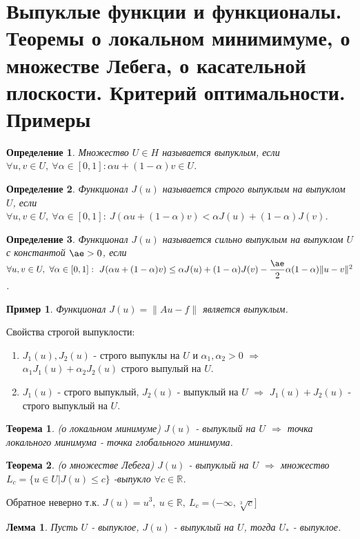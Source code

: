 \documentclass[9pt, a4paper]{extarticle}
\newtheorem*{theorem}{Теорема}
\newtheorem*{lemma}{Лемма}
\newtheorem*{definition}{Определение}
\newtheorem*{sample}{Пример}
\begin{document}
\section{Выпуклые функции и функционалы. Теоремы о локальном минимимуме, о множестве Лебега, о касательной плоскости. Критерий оптимальности. Примеры}
	\begin{definition}
		Множество $U \in H$ называется выпуклым, если $\forall u, v \in U, \ \forall \alpha \in [0,1]: \alpha u + (1-\alpha) v \in U$. 
	\end{definition}
	\begin{definition}
		Функционал $J(u)$ называется строго выпуклым на выпуклом $U$, если $\forall u, v \in U, \ \forall \alpha \in [0,1]: \ J(\alpha u + (1-\alpha)v) <  \alpha J(u) + (1-\alpha) J(v)$.
	\end{definition}
	\begin{definition}
		Функционал $J(u)$ называется сильно выпуклым на выпуклом $U$ с константой $\ae > 0$, если $\forall u, v \in U, \ \forall \alpha \in [0,1]: \ J(\alpha u + (1-\alpha)v) \leq  \alpha J(u) + (1-\alpha) J(v) - \dfrac\ae2 \alpha(1-\alpha) \|u-v\|^2$.
	\end{definition}
	\begin{sample}
		Функционал $J(u) = \|Au - f\|$ является выпуклым.
	\end{sample}
	Свойства строгой выпуклости:
	\begin{enumerate}
		\item $J_1(u), J_2(u)$ - строго выпуклы на $U$ и $\alpha_1, \alpha_2 >0$ $\Rightarrow$ $\alpha_1 J_1(u) + \alpha_2 J_2(u)$ строго выпулый на $U$. 
		\item $J_1(u)$ - строго выпуклый, $J_2(u)$ - выпуклый на $U$ $\Rightarrow$ $J_1(u) + J_2(u)$ - строго выпуклый на $U$. 
	\end{enumerate}
	\begin{theorem}
		(о локальном минимуме)\newline
		$J(u)$ - выпуклый на $U$ $\Rightarrow$ точка локального минимума - точка глобального минимума.
	\end{theorem}
	\begin{theorem}
		(о множестве Лебега)\newline
		$J(u)$ - выпуклый на $U$ $\Rightarrow$ множество $L_c = \{u \in U \vert J(u) \leq c\}$ -выпукло $\forall c \in \mathbb{R}$. 
	\end{theorem}
	Обратное неверно т.к. $J(u) = u^3, \ u\in \mathbb{R}, \ L_c = (-\infty, \sqrt[3]{c}]$
	\begin{lemma}
		Пусть $U$ - выпуклое, $J(u)$ - выпуклый на $U$, тогда $U_*$ - выпуклое.
	\end{lemma}
\end{document}

